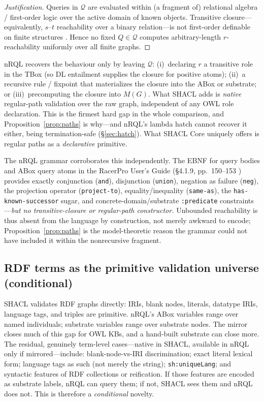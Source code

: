 \documentclass[11pt,letterpaper]{article}
\theoremstyle{definition}
\newcommand{\nrql}{nRQL}
\newcommand{\shacl}{SHACL}
\newcommand{\naf}{negation as failure}
\newcommand{\abox}{ABox}
\newcommand{\tbox}{TBox}
\newcommand{\rdf}{RDF}
\newcommand{\owl}{OWL}
\begin{document}
\begin{proof}[Justification]
Queries in $\mathcal{Q}$ are evaluated within (a fragment of) relational algebra / first-order logic over the active domain of known objects. Transitive closure---equivalently, $s$--$t$ reachability over a binary relation---is not first-order definable on finite structures \cite{ahoullman,libkin}. Hence no fixed $Q\in\mathcal{Q}$ computes arbitrary-length $r$-reachability uniformly over all finite graphs. \end{proof}

\noindent \nrql{} recovers the behaviour only by leaving $\mathcal{Q}$: (i)~declaring $r$ a transitive role in the \tbox{} (so DL entailment supplies the closure for positive atoms); (ii)~a recursive rule / fixpoint that materializes the closure into the \abox{} or substrate; or (iii)~precomputing the closure into $M(G)$. What \shacl{} adds is \emph{native} regular-path validation over the raw graph, independent of any \owl{} role declaration. This is the firmest hard gap in the whole comparison, and Proposition~\ref{prop:paths} is why---and \nrql{}'s lambda hatch cannot recover it either, being termination-safe (\S\ref{sec:hatch}). What \shacl{} Core uniquely offers is regular paths as a \emph{declarative} primitive.

The \nrql{} grammar corroborates this independently. The EBNF for query bodies and \abox{} query atoms in the RacerPro User's Guide (\S4.1.9, pp.~150--153 \cite{racerug}) provides exactly conjunction (\texttt{and}), disjunction (\texttt{union}), \naf{} (\texttt{neg}), the projection operator (\texttt{project-to}), equality/inequality (\texttt{same-as}), the \texttt{has-known-successor} sugar, and concrete-domain/substrate \texttt{:predicate} constraints---\emph{but no transitive-closure or regular-path constructor.} Unbounded reachability is thus absent from the language by construction, not merely awkward to encode; Proposition~\ref{prop:paths} is the model-theoretic reason the grammar could not have included it within the nonrecursive fragment.

\subsection{RDF terms as the primitive validation universe (conditional)}\label{sec:term}
\shacl{} validates \rdf{} graphs directly: IRIs, blank nodes, literals, datatype IRIs, language tags, and triples are primitive. \nrql{}'s \abox{} variables range over named individuals; substrate variables range over substrate nodes. The mirror closes much of this gap for \owl{} KBs, and a hand-built substrate can close more. The residual, genuinely term-level cases---native in \shacl{}, available in \nrql{} only if mirrored---include: blank-node-vs-IRI discrimination; exact literal lexical form; language tags as such (not merely the string); \texttt{sh:uniqueLang}; and syntactic features of \rdf{} collections or reification. If those features are encoded as substrate labels, \nrql{} can query them; if not, \shacl{} sees them and \nrql{} does not. This is therefore a \emph{conditional} novelty.
\end{document}
